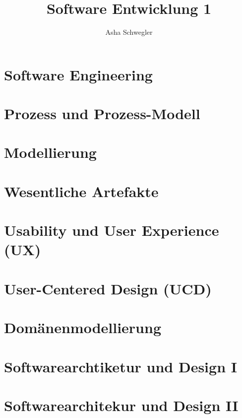 \documentclass{article}
\title{Software Entwicklung 1}
\author{Asha Schwegler}
\begin{document}
\maketitle
\tableofcontents
\newpage


\section{Software Engineering}





\section{Prozess und Prozess-Modell}



\section{Modellierung}


\section{Wesentliche Artefakte}



\section{Usability und User Experience (UX)}


\section{User-Centered Design (UCD)}




\section{Domänenmodellierung}




\section{Softwarearchtiketur und Design I}


\section{Softwarearchitekur und Design II}

\end{document}

